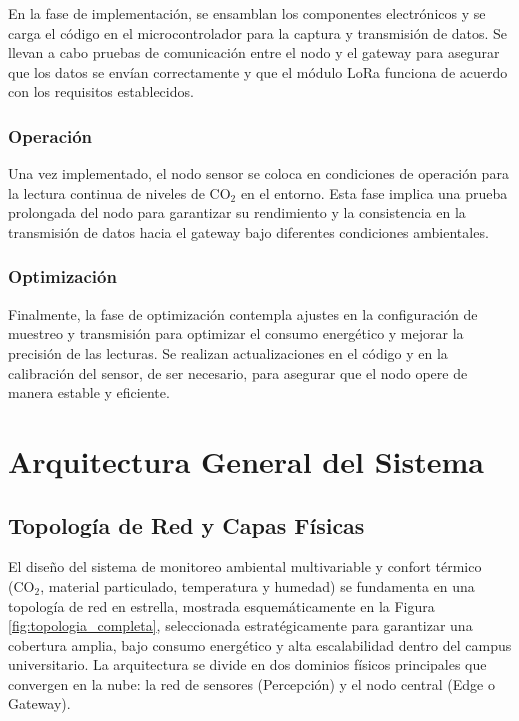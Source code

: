 En la fase de implementación, se ensamblan los componentes electrónicos y se carga el código en el microcontrolador para la captura y transmisión de datos. Se llevan a cabo pruebas de comunicación entre el nodo y el gateway para asegurar que los datos se envían correctamente y que el módulo LoRa funciona de acuerdo con los requisitos establecidos.

\subsubsection{Operación}

Una vez implementado, el nodo sensor se coloca en condiciones de operación para la lectura continua de niveles de CO\(_2\) en el entorno. Esta fase implica una prueba prolongada del nodo para garantizar su rendimiento y la consistencia en la transmisión de datos hacia el gateway bajo diferentes condiciones ambientales.

\subsubsection{Optimización}

Finalmente, la fase de optimización contempla ajustes en la configuración de muestreo y transmisión para optimizar el consumo energético y mejorar la precisión de las lecturas. Se realizan actualizaciones en el código y en la calibración del sensor, de ser necesario, para asegurar que el nodo opere de manera estable y eficiente.


















\section{Arquitectura General del Sistema}
\subsection{Topología de Red y Capas Físicas}

El diseño del sistema de monitoreo ambiental multivariable y confort térmico (CO\(_2\), material particulado, temperatura y humedad) se fundamenta en una topología de red en estrella, mostrada esquemáticamente en la Figura \ref{fig:topologia_completa}, seleccionada estratégicamente para garantizar una cobertura amplia, bajo consumo energético y alta escalabilidad dentro del campus universitario. La arquitectura se divide en dos dominios físicos principales que convergen en la nube: la red de sensores (Percepción) y el nodo central (Edge o Gateway).

